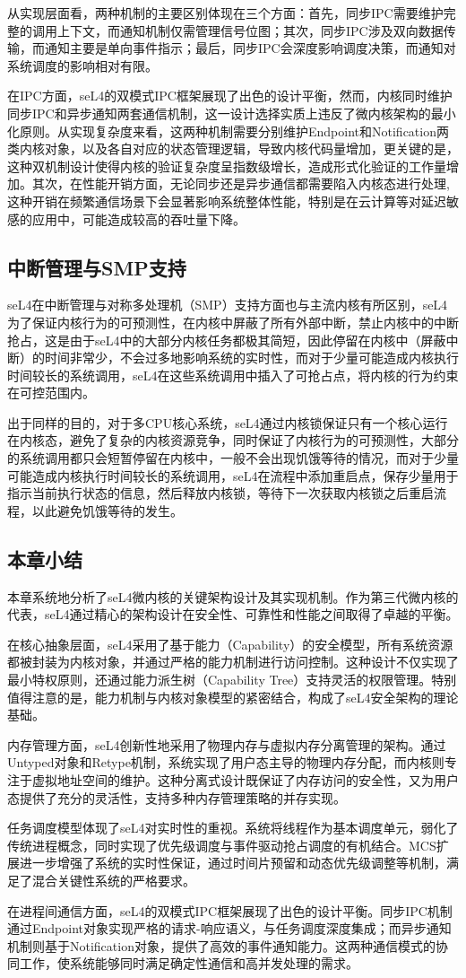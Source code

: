 从实现层面看，两种机制的主要区别体现在三个方面：首先，同步IPC需要维护完整的调用上下文，而通知机制仅需管理信号位图；其次，同步IPC涉及双向数据传输，而通知主要是单向事件指示；最后，同步IPC会深度影响调度决策，而通知对系统调度的影响相对有限。

在IPC方面，seL4的双模式IPC框架展现了出色的设计平衡，然而，内核同时维护同步IPC和异步通知两套通信机制，这一设计选择实质上违反了微内核架构的最小化原则。从实现复杂度来看，这两种机制需要分别维护Endpoint和Notification两类内核对象，以及各自对应的状态管理逻辑，导致内核代码量增加，更关键的是，这种双机制设计使得内核的验证复杂度呈指数级增长，造成形式化验证的工作量增加。其次，在性能开销方面，无论同步还是异步通信都需要陷入内核态进行处理,这种开销在频繁通信场景下会显著影响系统整体性能，特别是在云计算等对延迟敏感的应用中，可能造成较高的吞吐量下降。

\subsection{中断管理与SMP支持}
seL4在中断管理与对称多处理机（SMP）支持方面也与主流内核有所区别，seL4为了保证内核行为的可预测性，在内核中屏蔽了所有外部中断，禁止内核中的中断抢占，这是由于seL4中的大部分内核任务都极其简短，因此停留在内核中（屏蔽中断）的时间非常少，不会过多地影响系统的实时性，而对于少量可能造成内核执行时间较长的系统调用，seL4在这些系统调用中插入了可抢占点，将内核的行为约束在可控范围内。

出于同样的目的，对于多CPU核心系统，seL4通过内核锁保证只有一个核心运行在内核态，避免了复杂的内核资源竞争，同时保证了内核行为的可预测性，大部分的系统调用都只会短暂停留在内核中，一般不会出现饥饿等待的情况，而对于少量可能造成内核执行时间较长的系统调用，seL4在流程中添加重启点，保存少量用于指示当前执行状态的信息，然后释放内核锁，等待下一次获取内核锁之后重启流程，以此避免饥饿等待的发生。

\subsection{本章小结}
本章系统地分析了seL4微内核的关键架构设计及其实现机制。作为第三代微内核的代表，seL4通过精心的架构设计在安全性、可靠性和性能之间取得了卓越的平衡。

在核心抽象层面，seL4采用了基于能力（Capability）的安全模型，所有系统资源都被封装为内核对象，并通过严格的能力机制进行访问控制。这种设计不仅实现了最小特权原则，还通过能力派生树（Capability Tree）支持灵活的权限管理。特别值得注意的是，能力机制与内核对象模型的紧密结合，构成了seL4安全架构的理论基础。

内存管理方面，seL4创新性地采用了物理内存与虚拟内存分离管理的架构。通过Untyped对象和Retype机制，系统实现了用户态主导的物理内存分配，而内核则专注于虚拟地址空间的维护。这种分离式设计既保证了内存访问的安全性，又为用户态提供了充分的灵活性，支持多种内存管理策略的并存实现。

任务调度模型体现了seL4对实时性的重视。系统将线程作为基本调度单元，弱化了传统进程概念，同时实现了优先级调度与事件驱动抢占调度的有机结合。MCS扩展进一步增强了系统的实时性保证，通过时间片预留和动态优先级调整等机制，满足了混合关键性系统的严格要求。

在进程间通信方面，seL4的双模式IPC框架展现了出色的设计平衡。同步IPC机制通过Endpoint对象实现严格的请求-响应语义，与任务调度深度集成；而异步通知机制则基于Notification对象，提供了高效的事件通知能力。这两种通信模式的协同工作，使系统能够同时满足确定性通信和高并发处理的需求。

